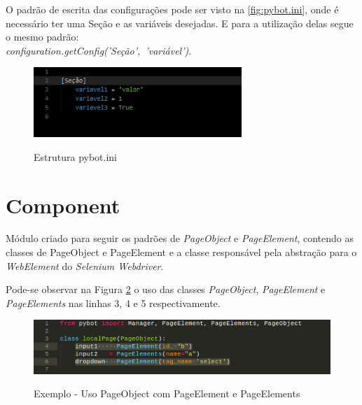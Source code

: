         O padrão de escrita das configurações pode ser visto na \autoref{fig:pybot.ini}, onde é necessário ter uma Seção e as variáveis desejadas.
        E para a utilização delas segue o mesmo padrão: \\ \mbox{\emph{configuration.getConfig('Seção', 'variável')}}.

        \begin{figure}[H]
            \vspace*{0,3cm}
            \centering
            \caption{Estrutura pybot.ini}
            \includegraphics[width=0.7\textwidth]{./04-figuras/ini}
            \label{fig:pybot.ini}
        \end{figure}
        \vspace*{-0,9cm}
        {\raggedright {}}



    \section{Component} \label{sec:comp}
        Módulo criado para seguir os padrões de \emph{PageObject} e \emph{PageElement}, contendo as classes de PageObject e PageElement e a classe responsável
        pela abstração para o \emph{WebElement} do \emph{Selenium Webdriver}.

        Pode-se observar na Figura \ref{fig:eleme} o uso das classes \emph{PageObject}, \emph{PageElement} e \emph{PageElements} nas linhas 3, 4 e 5 respectivamente.

        \begin{figure}[H]
            \vspace*{0,3cm}
            \centering
            \caption{Exemplo - Uso PageObject com PageElement e PageElements}
            \includegraphics[width=1\textwidth]{./04-figuras/pageElement}
            \label{fig:eleme}
        \end{figure}
        \vspace*{-0,9cm}
        {\raggedright {}}

